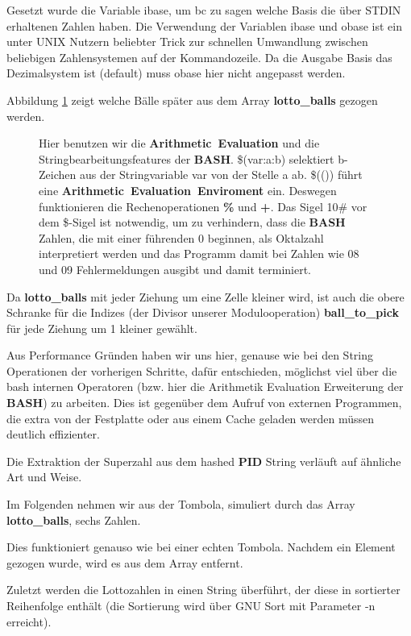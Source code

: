 \documentclass[11pt,a4paper]{article}
\newcommand{\extname}[1]{\mbox{\textbf{#1}}}
\begin{document}
Gesetzt wurde die Variable ibase, um bc zu sagen welche Basis die über STDIN erhaltenen Zahlen haben. Die Verwendung der Variablen ibase und obase ist ein unter UNIX Nutzern beliebter Trick zur schnellen Umwandlung zwischen beliebigen Zahlensystemen auf der Kommandozeile. Da die Ausgabe Basis das Dezimalsystem ist (default) muss obase hier nicht angepasst werden.

Abbildung \ref{balltopick} zeigt welche Bälle später aus dem Array \extname{lotto\_balls} gezogen werden.

\begin{figure}[htbp]
  \centering
  \fbox{
    
  }
  \caption{Hier benutzen wir die \extname{Arithmetic Evaluation} und die Stringbearbeitungsfeatures der \extname{BASH}. \$(var:a:b) selektiert b-Zeichen aus der Stringvariable var von der Stelle a ab. \$(()) führt eine \extname{Arithmetic Evaluation Enviroment}  ein. Deswegen funktionieren die Rechenoperationen \extname{\%} und \extname{+}. Das Sigel 10\# vor dem \$-Sigel ist notwendig, um zu verhindern, dass die \extname{BASH} Zahlen, die mit einer führenden 0 beginnen, als Oktalzahl interpretiert werden und das Programm damit bei Zahlen wie 08 und 09 Fehlermeldungen ausgibt und damit terminiert.}
  \label{balltopick}
\end{figure}

Da \extname{lotto\_balls} mit jeder Ziehung um eine Zelle kleiner wird, ist auch die obere Schranke für die Indizes (der Divisor unserer Modulooperation)
  \extname{ball\_to\_pick} für jede Ziehung um 1 kleiner gewählt.

Aus Performance Gründen haben wir uns hier, genause wie bei den String Operationen der vorherigen Schritte, dafür entschieden, möglichst viel über die bash internen Operatoren (bzw. hier die Arithmetik Evaluation Erweiterung der \extname{BASH}) zu arbeiten.
Dies ist gegenüber dem Aufruf von externen Programmen, die extra von der Festplatte oder aus einem Cache geladen werden müssen deutlich effizienter.

Die Extraktion der Superzahl aus dem hashed \extname{PID} String verläuft auf ähnliche Art und Weise.

Im Folgenden nehmen wir aus der Tombola, simuliert durch das Array \extname{lotto\_balls}, sechs Zahlen.

Dies funktioniert genauso wie bei einer echten Tombola. Nachdem ein Element gezogen wurde, wird es aus dem Array entfernt.

Zuletzt werden die Lottozahlen in einen String überführt, der diese in sortierter Reihenfolge enthält (die Sortierung wird über GNU Sort mit Parameter -n erreicht).
\end{document}
